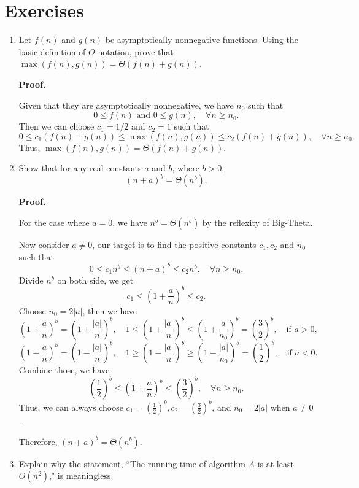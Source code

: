 \documentclass[12pt]{article}
\begin{document}
\section*{Exercises}
\begin{enumerate}
    \item Let \(f(n)\) and \(g(n)\) be asymptotically nonnegative functions. Using the basic definition of \(\Theta\)-notation, prove that \(\max(f(n), g(n)) = \Theta(f(n) + g(n))\).

    \textbf{Proof.}

    Given that they are asymptotically nonnegative, we have \(n_0\) such that
    \[
        0 \leq f(n) \text{ and } 0 \leq g(n), \quad \forall n \geq n_0.
    \]
    Then we can choose \(c_1 = 1/2\) and \(c_2 = 1\) such that
    \[
        0 \leq c_1 (f(n) + g(n)) \leq \max(f(n), g(n)) \leq c_2 (f(n) + g(n)), \quad \forall n \geq n_0.
    \]
    Thus, \(\max(f(n), g(n)) = \Theta(f(n) + g(n))\).

    \item Show that for any real constants \(a\) and \(b\), where \(b > 0\),
    \[
        (n + a)^b = \Theta(n^b).
    \]

    \textbf{Proof.}

    For the case where \(a = 0\), we have \(n^b = \Theta(n^b)\) by the reflexity of Big-Theta.

    Now consider \(a \neq 0\), our target is to find the positive constants \(c_1, c_2\) and \(n_0\) such that
    \[
        0 \leq c_1 n^b \leq (n + a)^b \leq c_2 n^b, \quad \forall n \geq n_0.
    \]
    Divide \(n^b\) on both side, we get
    \[
        c_1 \leq (1 + \frac{a}{n})^b \leq c_2.
    \]
    Choose \(n_0 = 2|a|\), then we have
    \[
        (1 + \frac{a}{n})^b = (1 + \frac{|a|}{n})^b, \quad 1 \leq (1 + \frac{|a|}{n})^b \leq (1 + \frac{a}{n_0})^b = (\frac{3}{2})^b, \quad \text{if } a > 0,
    \]
    \[
        (1 + \frac{a}{n})^b = (1 - \frac{|a|}{n})^b, \quad 1 \geq (1 - \frac{|a|}{n})^b \geq (1 - \frac{|a|}{n_0})^b = (\frac{1}{2})^b, \quad \text{if } a < 0.
    \]
    Combine those, we have
    \[
        (\frac{1}{2})^b \leq (1 + \frac{a}{n})^b \leq (\frac{3}{2})^b, \quad \forall n \geq n_0.
    \]
    Thus, we can always choose \(c_1 = (\frac{1}{2})^b, c_2 = (\frac{3}{2})^b\), and \(n_0 = 2|a|\) when \(a \neq 0\).

    Therefore, \((n + a)^b = \Theta(n^b)\).

    \item Explain why the statement, ``The running time of algorithm \(A\) is at least \(O(n^2)\)," is meaningless.


\end{enumerate}
\end{document}
